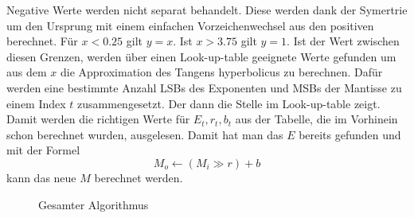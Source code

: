 Negative Werte werden nicht separat behandelt. Diese werden dank der Symertrie um den Ursprung mit einem einfachen Vorzeichenwechsel aus den positiven berechnet.
Für $x < 0.25$ gilt $y = x$.
Ist $x > 3.75$ gilt $y = 1$.
Ist der Wert zwischen diesen Grenzen, werden über einen Look-up-table geeignete Werte gefunden um aus dem $x$ die Approximation des Tangens hyperbolicus zu berechnen.
Dafür werden eine bestimmte Anzahl LSBs des Exponenten und MSBs der Mantisse zu einem Index $t$ zusammengesetzt. Der dann die Stelle im Look-up-table zeigt.
Damit werden die richtigen Werte für $E_{t}, r_{t}, b_{t}$ aus der Tabelle, die im Vorhinein schon berechnet wurden, ausgelesen.
Damit hat man das $E$ bereits gefunden und mit der Formel
$$M_{o} \leftarrow\left(M_{i} \gg r\right)+b$$
kann das neue $M$ berechnet werden.

\begin{figure}
\centering
{}
\caption{Gesamter Algorithmus
\label{motivation:figure:gesalgo}}
\end{figure}

